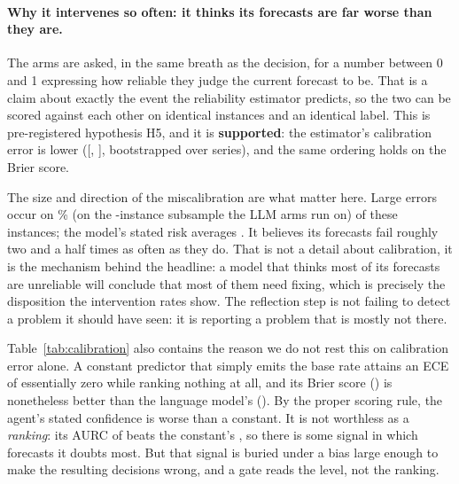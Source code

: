 \begin{table}[htbp]
\centering
\caption{Does verbal self-critique carry information about whether to correct? All
columns are computed on the same instances against the same ground-truth
\texttt{should\_correct} label. ``AUROC (critique)'' scores a binary yes/no and is
therefore balanced accuracy; ``AUROC (arithmetic)'' scores a continuous estimator and
is credited for ranking, so the two are compared at matched footing in the text rather
than by subtracting these columns. $\Delta$ AUROC is the within-model quantity the
claim rests on: the same model, the same instances, deciding with and without being
asked to reflect. ``Overlap'' is the Jaccard overlap of the two intervention sets.}
\label{tab:discrimination}
\small
\fittable{}
\end{table}

\paragraph{Why it intervenes so often: it thinks its forecasts are far worse than
they are.}
The arms are asked, in the same breath as the decision, for a number between 0 and 1
expressing how reliable they judge the current forecast to be. That is a claim about
exactly the event the reliability estimator predicts, so the two can be scored against
each other on identical instances and an identical label. This is pre-registered
hypothesis H5, and it is \textbf{supported}: the estimator's calibration error is
\calEceDiff{} lower ([\calEceDiffCIlo, \calEceDiffCIhi], bootstrapped over series),
and the same ordering holds on the Brier score.

The size and direction of the miscalibration are what matter here. Large errors occur
on \calBaseRate\% (on the \calN-instance subsample the LLM arms run on) of these instances; the model's stated risk averages
\calLlmMeanRisk{}. It believes its forecasts fail roughly two and a half times as often
as they do. That is not a detail about calibration, it is the mechanism behind the
headline: a model that thinks most of its forecasts are unreliable will conclude that
most of them need fixing, which is precisely the disposition the intervention rates
show. The reflection step is not failing to detect a problem it should have seen: it is reporting a problem that is mostly not there.

Table~\ref{tab:calibration} also contains the reason we do not rest this on calibration
error alone. A constant predictor that simply emits the base rate attains an ECE of
essentially zero while ranking nothing at all, and its Brier score (\calConstBrier{})
is nonetheless better than the language model's (\calLlmBrier{}). By the proper
scoring rule, the agent's stated confidence is worse than a constant. It is not
worthless as a \emph{ranking}: its AURC of \calLlmAurc{} beats the constant's
\calConstAurc{}, so there is some signal in which forecasts it doubts most. But that
signal is buried under a bias large enough to make the resulting decisions wrong, and a
gate reads the level, not the ranking.

